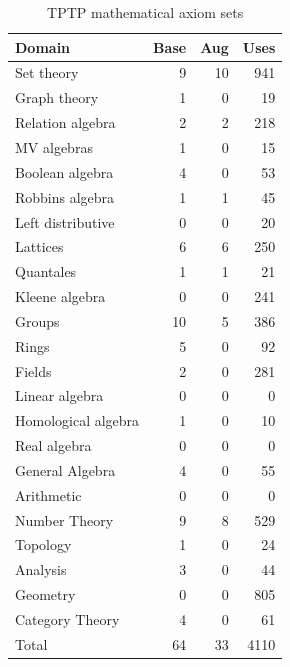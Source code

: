 \documentclass[runningheads]{llncs}
\begin{document}
\begin{table}[tb]
\begin{center}
\setlength{\tabcolsep}{4pt}
\begin{tabular}{l|rrr}
Domain              & Base & Aug  & Uses \\
\hline
Set theory          &    9 &   10 & 941  \\
Graph theory        &    1 &    0 &  19  \\
Relation algebra    &    2 &    2 & 218  \\
MV algebras         &    1 &    0 &  15  \\
Boolean algebra     &    4 &    0 &  53  \\
Robbins algebra     &    1 &    1 &  45  \\
Left distributive   &    0 &    0 &  20  \\
Lattices            &    6 &    6 & 250  \\
Quantales           &    1 &    1 &  21  \\
Kleene algebra      &    0 &    0 & 241  \\
Groups              &   10 &    5 & 386  \\
Rings               &    5 &    0 &  92  \\
Fields              &    2 &    0 & 281  \\
Linear algebra      &    0 &    0 &   0  \\
Homological algebra &    1 &    0 &  10  \\
Real algebra        &    0 &    0 &   0  \\
General Algebra     &    4 &    0 &  55  \\
Arithmetic          &    0 &    0 &   0  \\
Number Theory       &    9 &    8 & 529  \\
Topology            &    1 &    0 &  24  \\
Analysis            &    3 &    0 &  44  \\
Geometry            &    0 &    0 & 805  \\
Category Theory     &    4 &    0 &  61  \\
\hline
Total               &   64 &   33 & 4110 \\
\end{tabular}
\end{center}
\caption{TPTP mathematical axiom sets}
\label{AxiomSets}
\end{table}

\end{document}

